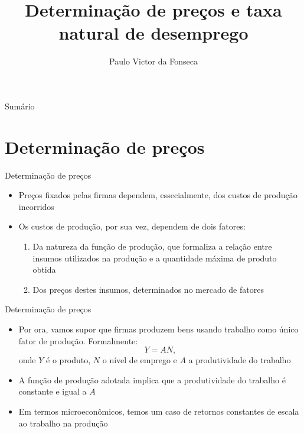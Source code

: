 \documentclass[10pt]{beamer}
\title[]{Determinação de preços e taxa natural de desemprego}
\author[]{Paulo Victor da Fonseca}
\date{}
\begin{document}
\begin{frame}[plain]
\end{frame}

\begin{frame}{Sumário}
    \tableofcontents
\end{frame}

\section{Determinação de preços}
\begin{frame}
    {Determinação de preços}
    \begin{itemize}
        \item Preços fixados pelas firmas dependem, essecialmente, dos custos de produção incorridos\bigskip
        \item Os custos de produção, por sua vez, dependem de dois fatores:\medskip
        \begin{enumerate}
            \item Da natureza da função de produção, que formaliza a relação entre insumos utilizados na produção e a quantidade máxima de produto obtida\medskip
            \item Dos preços destes insumos, determinados no mercado de fatores
        \end{enumerate}
    \end{itemize}
\end{frame}

\begin{frame}
    {Determinação de preços}
    \begin{itemize}
        \item Por ora, vamos supor que firmas produzem bens usando trabalho como único fator de produção. Formalmente:
        \begin{equation}
            Y = AN,
        \end{equation}
        onde $Y$ é o produto, $N$ o nível de emprego e $A$ a produtividade do trabalho\bigskip
        \item A função de produção adotada implica que a produtividade do trabalho é constante e igual a $A$\bigskip
        \item Em termos microeconômicos, temos um caso de retornos constantes de escala ao trabalho na produção
    \end{itemize}
\end{frame}
\end{document}
